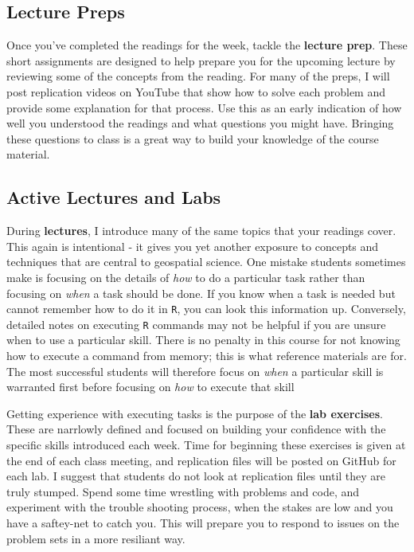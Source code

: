 \documentclass[]{book}
\theoremstyle{definition}
\theoremstyle{definition}
\theoremstyle{definition}
\theoremstyle{remark}
\begin{document}
\subsection{Lecture Preps}\label{lecture-preps}

Once you've completed the readings for the week, tackle the
\textbf{lecture prep}. These short assignments are designed to help
prepare you for the upcoming lecture by reviewing some of the concepts
from the reading. For many of the preps, I will post replication videos
on YouTube that show how to solve each problem and provide some
explanation for that process. Use this as an early indication of how
well you understood the readings and what questions you might have.
Bringing these questions to class is a great way to build your knowledge
of the course material.

\subsection{Active Lectures and Labs}\label{active-lectures-and-labs}

During \textbf{lectures}, I introduce many of the same topics that your
readings cover. This again is intentional - it gives you yet another
exposure to concepts and techniques that are central to geospatial
science. One mistake students sometimes make is focusing on the details
of \emph{how} to do a particular task rather than focusing on
\emph{when} a task should be done. If you know when a task is needed but
cannot remember how to do it in \texttt{R}, you can look this
information up. Conversely, detailed notes on executing \texttt{R}
commands may not be helpful if you are unsure when to use a particular
skill. There is no penalty in this course for not knowing how to execute
a command from memory; this is what reference materials are for. The
most successful students will therefore focus on \emph{when} a
particular skill is warranted first before focusing on \emph{how} to
execute that skill

Getting experience with executing tasks is the purpose of the
\textbf{lab exercises}. These are narrlowly defined and focused on
building your confidence with the specific skills introduced each week.
Time for beginning these exercises is given at the end of each class
meeting, and replication files will be posted on GitHub for each lab. I
suggest that students do not look at replication files until they are
truly stumped. Spend some time wrestling with problems and code, and
experiment with the trouble shooting process, when the stakes are low
and you have a saftey-net to catch you. This will prepare you to respond
to issues on the problem sets in a more resiliant way.
\end{document}
